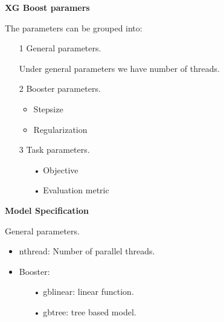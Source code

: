 \textbf{XG Boost paramers}

The parameters can be grouped into:
\begin{enumerate}
\item[1] General parameters.

Under general parameters we have number of threads.

\item[2] Booster parameters.
\begin{itemize}
\item Stepsize
\item  Regularization
\end{itemize}
       
\item[3] Task parameters.

\begin{itemize}
\item[•] Objective
\item[•] Evaluation metric
\end{itemize}
\end{enumerate}

\begin{center}
\textbf{Model Specification}
\end{center}

General parameters.
\begin{itemize}
\item nthread: Number of parallel threads.

\item Booster: 
  \begin{itemize}
  \item[•] gblinear: linear function.
  \item[•] gbtree: tree based model.
  \end{itemize}
\end{itemize}

